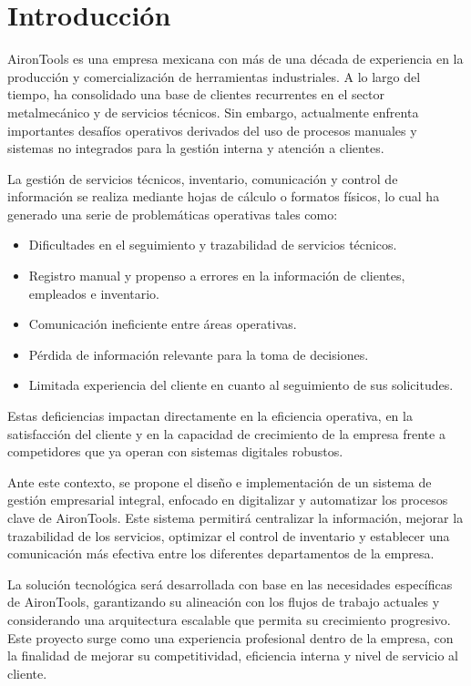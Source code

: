 \section{Introducción}

AironTools es una empresa mexicana con más de una década de experiencia en la producción y comercialización de herramientas industriales. A lo largo del tiempo, ha consolidado una base de clientes recurrentes en el sector metalmecánico y de servicios técnicos. Sin embargo, actualmente enfrenta importantes desafíos operativos derivados del uso de procesos manuales y sistemas no integrados para la gestión interna y atención a clientes.

La gestión de servicios técnicos, inventario, comunicación y control de información se realiza mediante hojas de cálculo o formatos físicos, lo cual ha generado una serie de problemáticas operativas tales como:

\begin{itemize}
    \item Dificultades en el seguimiento y trazabilidad de servicios técnicos.
    \item Registro manual y propenso a errores en la información de clientes, empleados e inventario.
    \item Comunicación ineficiente entre áreas operativas.
    \item Pérdida de información relevante para la toma de decisiones.
    \item Limitada experiencia del cliente en cuanto al seguimiento de sus solicitudes.
\end{itemize}

Estas deficiencias impactan directamente en la eficiencia operativa, en la satisfacción del cliente y en la capacidad de crecimiento de la empresa frente a competidores que ya operan con sistemas digitales robustos.

Ante este contexto, se propone el diseño e implementación de un sistema de gestión empresarial integral, enfocado en digitalizar y automatizar los procesos clave de AironTools. Este sistema permitirá centralizar la información, mejorar la trazabilidad de los servicios, optimizar el control de inventario y establecer una comunicación más efectiva entre los diferentes departamentos de la empresa.

La solución tecnológica será desarrollada con base en las necesidades específicas de AironTools, garantizando su alineación con los flujos de trabajo actuales y considerando una arquitectura escalable que permita su crecimiento progresivo. Este proyecto surge como una experiencia profesional dentro de la empresa, con la finalidad de mejorar su competitividad, eficiencia interna y nivel de servicio al cliente.

